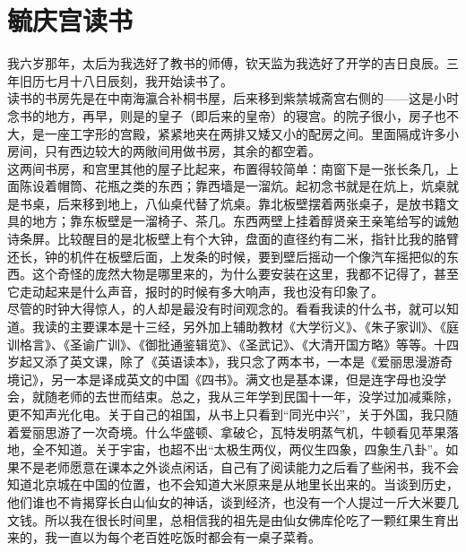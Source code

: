 \fancyhead[RO]{} %
\fancyhead[LE]{} %
\chapter*{毓庆宫读书}
\thispagestyle{empty}
我六岁那年，太后为我选好了教书的师傅，钦天监为我选好了开学的吉日良辰。三年旧历七月十八日辰刻，我开始读书了。\\

读书的书房先是在中南海瀛合补桐书屋，后来移到紫禁城斋宫右侧的——这是小时念书的地方，再早，则是的皇子（即后来的皇帝）的寝宫。的院子很小，房子也不大，是一座工字形的宫殿，紧紧地夹在两排又矮又小的配房之间。里面隔成许多小房间，只有西边较大的两敞间用做书房，其余的都空着。\\

这两间书房，和宫里其他的屋子比起来，布置得较简单：南窗下是一张长条几，上面陈设着帽筒、花瓶之类的东西；靠西墙是一溜炕。起初念书就是在炕上，炕桌就是书桌，后来移到地上，八仙桌代替了炕桌。靠北板壁摆着两张桌子，是放书籍文具的地方；靠东板壁是一溜椅子、茶几。东西两壁上挂着醇贤亲王亲笔给写的诚勉诗条屏。比较醒目的是北板壁上有个大钟，盘面的直径约有二米，指针比我的胳臂还长，钟的机件在板壁后面，上发条的时候，要到壁后摇动一个像汽车摇把似的东西。这个奇怪的庞然大物是哪里来的，为什么要安装在这里，我都不记得了，甚至它走动起来是什么声音，报时的时候有多大响声，我也没有印象了。\\

尽管的时钟大得惊人，的人却是最没有时间观念的。看看我读的什么书，就可以知道。我读的主要课本是十三经，另外加上辅助教材《大学衍义》、《朱子家训》、《庭训格言》、《圣谕广训》、《御批通鉴辑览》、《圣武记》、《大清开国方略》等等。十四岁起又添了英文课，除了《英语读本》，我只念了两本书，一本是《爱丽思漫游奇境记》，另一本是译成英文的中国《四书》。满文也是基本课，但是连字母也没学会，就随老师的去世而结束。总之，我从三年学到民国十一年，没学过加减乘除，更不知声光化电。关于自己的祖国，从书上只看到“同光中兴”，关于外国，我只随着爱丽思游了一次奇境。什么华盛顿、拿破仑，瓦特发明蒸气机，牛顿看见苹果落地，全不知道。关于宇宙，也超不出“太极生两仪，两仪生四象，四象生八卦”。如果不是老师愿意在课本之外谈点闲话，自己有了阅读能力之后看了些闲书，我不会知道北京城在中国的位置，也不会知道大米原来是从地里长出来的。当谈到历史，他们谁也不肯揭穿长白山仙女的神话，谈到经济，也没有一个人提过一斤大米要几文钱。所以我在很长时间里，总相信我的祖先是由仙女佛库伦吃了一颗红果生育出来的，我一直以为每个老百姓吃饭时都会有一桌子菜肴。\\

